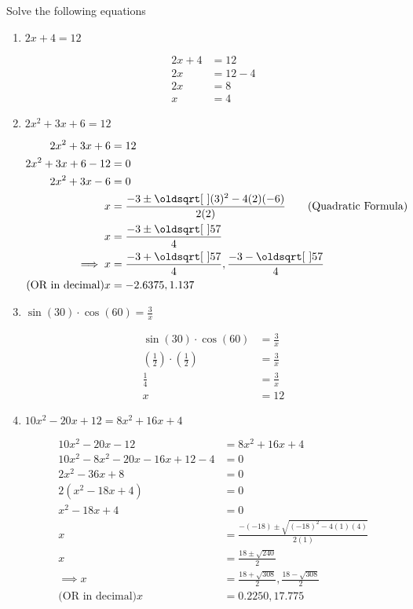\documentclass[11pt]{article} %
\begin{document}
\begin{qstn}[1] %
Solve the following equations
\begin{enumerate}
\item $2x + 4 = 12$

\begin{soln}
\begin{align*}
2x + 4 &= 12\\
2x &= 12 - 4\\
2x &= 8\\
x &= 4
\end{align*}
\end{soln}

\item $2x^2 + 3x + 6 = 12$
\begin{soln}
\begin{align*}
2x^2 + 3x + 6 &= 12\\
2x^2 + 3x + 6 - 12 &= 0\\
2x^2 + 3x - 6 &= 0\\
x &= \frac{-3 \pm \sqrt{(3)^2 - 4(2)(-6)}}{2(2)} \tag{\text{Quadratic Formula}}\\
x &=  \frac{-3 \pm \sqrt{57}}{4}\\
\implies x &= \frac{-3 + \sqrt{57}}{4}, \frac{-3 - \sqrt{57}}{4}\\
\text{(OR in decimal)} x &= -2.6375, 1.137
\end{align*}
\end{soln}

\item $\sin(30)\cdot \cos(60) = \frac{3}{x}$

\begin{soln}
\begin{align*}
\sin(30)\cdot \cos(60) &= \frac{3}{x}\\
(\frac{1}{2})\cdot(\frac{1}{2}) &= \frac{3}{x}\\
\frac{1}{4} &= \frac{3}{x}\\
x &= 12
\end{align*}
\end{soln}

\item $10x^2 - 20x + 12 = 8x^2 + 16x + 4$

\begin{soln}
\begin{align*}
10x^2 - 20x - 12 &= 8x^2 + 16x + 4 \\
10x^2 - 8x^2 - 20x - 16x + 12 - 4 &= 0\\
2x^2 -36x + 8 &= 0 \\
2(x^2 - 18x + 4) &= 0\\
x^2 - 18x + 4 &= 0\\
x &= \frac{-(-18) \pm \sqrt{(-18)^2 - 4(1)(4)}}{2(1)}\\
x &= \frac{18 \pm \sqrt{240}}{2}\\
\implies x &= \frac{18 + \sqrt{308}}{2}, \frac{18 - \sqrt{308}}{2}\\
\text{(OR in decimal)} x &= 0.2250, 17.775
\end{align*}


\end{soln}
\end{enumerate}
\end{qstn}
\end{document}
